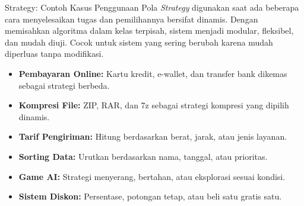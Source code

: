 \documentclass[aspectratio=169, table]{beamer}
\begin{document}
\begin{frame}{Strategy: Contoh Kasus Penggunaan}
	\vspace{10pt}
	Pola \textit{Strategy} digunakan saat ada beberapa cara menyelesaikan tugas dan pemilihannya bersifat dinamis. Dengan memisahkan algoritma dalam kelas terpisah, sistem menjadi modular, fleksibel, dan mudah diuji. Cocok untuk sistem yang sering berubah karena mudah diperluas tanpa modifikasi.
	
	\vspace{6pt}
	\begin{itemize}
		\item \textbf{Pembayaran Online:} Kartu kredit, e-wallet, dan transfer bank dikemas sebagai strategi berbeda.
		\item \textbf{Kompresi File:} ZIP, RAR, dan 7z sebagai strategi kompresi yang dipilih dinamis.
		\item \textbf{Tarif Pengiriman:} Hitung berdasarkan berat, jarak, atau jenis layanan.
		\item \textbf{Sorting Data:} Urutkan berdasarkan nama, tanggal, atau prioritas.
		\item \textbf{Game AI:} Strategi menyerang, bertahan, atau eksplorasi sesuai kondisi.
		\item \textbf{Sistem Diskon:} Persentase, potongan tetap, atau beli satu gratis satu.
	\end{itemize}
\end{frame}
\end{document}

